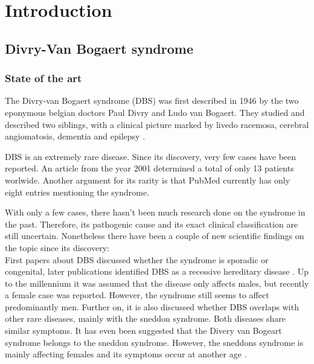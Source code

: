 \chapter{Introduction}
\label{sec:Chapter1}


\section{ Divry-Van Bogaert syndrome}
\label{sec:Sec1.1}

\subsection{State of the art}
\label{sec:Sec1.1.1}



The Divry-van Bogaert syndrome (DBS)  was first described in 1946 by the two eponymous belgian doctors Paul Divry and Ludo van Bogaert. They studied and described two siblings, with a clinical picture marked by livedo racemosa, cerebral
angiomatosis, dementia and epilepsy \cite{sds, cauf, dvf, dvbp}.

DBS is an extremely rare disease.
Since its discovery, very few cases have been reported. An article from the year 2001 determined a total of only 13 patients worlwide\cite{cauf, dvf}. Another argument for its rarity is that PubMed currently has only eight entries mentioning the syndrome\cite{pubmed1}. 

With only a few cases, there hasn't been much research done on the syndrome in the past. Therefore, its pathogenic cause and its exact clinical classification are still uncertain. 
Nonetheless there have been a couple of new scientific findings on the topic since its discovery:\\
First papers about DBS discussed whether the syndrome is sporadic or congenital\cite{dvf,cauf}, later publications identified DBS as a recessive hereditary disease \cite{dvbp}. Up to the millennium it was assumed that the disease only affects males, but recently a female case was reported. However, the syndrome still seems to affect predominantly men. Further on, it is also discussed whether DBS overlaps with other rare diseases, mainly with the sneddon syndrome\cite{sds}. Both diseases share similar symptoms. It has even been suggested that the Divery van Bogeart syndrome belongs to the sneddon syndrome. 
However, the sneddons syndrome is mainly affecting females and its symptoms occur at another age \cite{sds}. 

